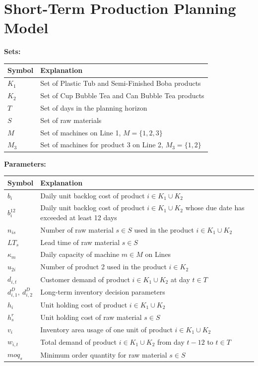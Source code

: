 \documentclass[nocoverpage]{buIE47xbooklet}
\begin{document}
{\section{Short-Term Production Planning Model}
\label{app:B} 

\noindent\textbf{Sets:}

\vspace{0.5em}
\noindent\begin{tabular}{p{}p{}}\toprule
\textbf{Symbol} & \textbf{Explanation} \\ \midrule
$K_1$ & Set of Plastic Tub and Semi-Finished Boba products\\
$K_2$ & Set of Cup Bubble Tea and Can Bubble Tea products\\
$T$ & Set of days in the planning horizon \\
$S$ & Set of raw materials \\
$M$ & Set of machines on Line 1, $M=\{1,2,3\}$ \\
$M_3$ & Set of machines for product 3 on Line 2, $M_3=\{1,2\}$ \\ \bottomrule
\end{tabular}


\vspace{0.8em}
\noindent\textbf{Parameters:}

\vspace{0.5em}
\noindent\begin{tabular}{p{}p{}}\toprule
\textbf{Symbol} & \textbf{Explanation} \\ \midrule
$b_i$ & Daily unit backlog cost of product $i \in K_1 \cup K_2$ \\
$b^{12}_i$ & Daily unit backlog cost of product $i \in K_1 \cup K_2$ whose due date has exceeded at least 12 days \\
$n_{is}$ & Number of raw material $s \in S$ used in the product $i \in K_1 \cup K_2$ \\
$LT_s$ & Lead time of raw material $s \in S$ \\
$\kappa_m$ & Daily capacity of machine $m \in M$ on Lines \\
$u_{2i}$ & Number of product 2 used in the product $i\in  K_2$\\
$d_{i,t}$ & Customer demand of product $i\in K_1 \cup K_2$ at day $t \in T$ \\
$d^D_{i,1},\ d^D_{i,2}$ & Long-term inventory decision parameters \\
$h_i$ & Unit holding cost of product $i\in K_1 \cup K_2$ \\
$h^r_s$ & Unit holding cost of raw material $s \in S$ \\
$v_i$ & Inventory area usage of one unit of product $i\in K_1 \cup K_2$ \\
$w_{i,t}$ & Total demand of product $i\in K_1 \cup K_2$ from day $t-12$ to $t \in T$ \\
$moq_s$ & Minimum order quantity for raw material $s \in S$ \\ \bottomrule
\end{tabular}


}
\end{document}
